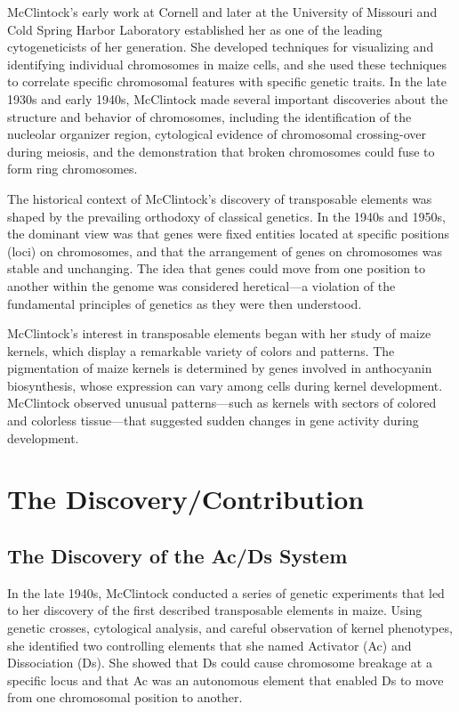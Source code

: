 McClintock's early work at Cornell and later at the University of Missouri and Cold Spring Harbor Laboratory established her as one of the leading cytogeneticists of her generation. She developed techniques for visualizing and identifying individual chromosomes in maize cells, and she used these techniques to correlate specific chromosomal features with specific genetic traits. In the late 1930s and early 1940s, McClintock made several important discoveries about the structure and behavior of chromosomes, including the identification of the nucleolar organizer region, cytological evidence of chromosomal crossing-over during meiosis, and the demonstration that broken chromosomes could fuse to form ring chromosomes.

The historical context of McClintock's discovery of transposable elements was shaped by the prevailing orthodoxy of classical genetics. In the 1940s and 1950s, the dominant view was that genes were fixed entities located at specific positions (loci) on chromosomes, and that the arrangement of genes on chromosomes was stable and unchanging. The idea that genes could move from one position to another within the genome was considered heretical---a violation of the fundamental principles of genetics as they were then understood.

McClintock's interest in transposable elements began with her study of maize kernels, which display a remarkable variety of colors and patterns. The pigmentation of maize kernels is determined by genes involved in anthocyanin biosynthesis, whose expression can vary among cells during kernel development. McClintock observed unusual patterns---such as kernels with sectors of colored and colorless tissue---that suggested sudden changes in gene activity during development.

\section{The Discovery/Contribution}

\subsection{The Discovery of the Ac/Ds System}

In the late 1940s, McClintock conducted a series of genetic experiments that led to her discovery of the first described transposable elements in maize. Using genetic crosses, cytological analysis, and careful observation of kernel phenotypes, she identified two controlling elements that she named Activator (Ac) and Dissociation (Ds). She showed that Ds could cause chromosome breakage at a specific locus and that Ac was an autonomous element that enabled Ds to move from one chromosomal position to another.


